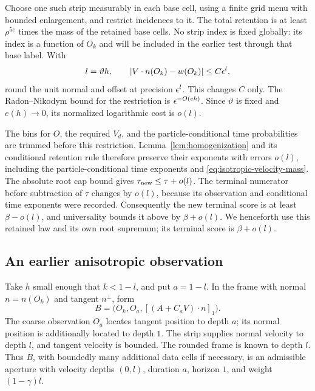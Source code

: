 Choose one such strip measurably in each base cell, using a finite grid menu
with bounded enlargement, and restrict incidences to it. The total retention
is at least $\rho^{5e}$ times the mass of the retained base cells. No strip
index is fixed globally: its index is a function of $O_k$ and will be included
in the earlier test through that base label. With
\begin{equation}
 l=\vartheta h,
 \qquad \lvert V\cdot n(O_k)-w(O_k)\rvert\leq C\epsilon^l,
 \label{eq:isotropic-strip}
\end{equation}
round the unit normal and offset at precision $\epsilon^l$. This changes $C$ only.
The Radon--Nikodym bound for the restriction is $\epsilon^{-O(eh)}$.
Since $\vartheta$ is fixed and $e(h)\to0$, its normalized logarithmic cost is
$o(l)$.

The bins for $O$, the required $V_d$, and the particle-conditional time
probabilities are trimmed before this restriction. Lemma~\ref{lem:homogenization}
and its conditional retention rule
therefore preserve their exponents with errors $o(l)$, including the
particle-conditional time exponents and \eqref{eq:isotropic-velocity-mass}.
The absolute root cap bound gives $\tau_{\rm new}\leq\tau+o(l)$.
The terminal numerator before subtraction of $\tau$ changes by $o(l)$, because
its observation and conditional time exponents were recorded. Consequently
the new terminal score is at least $\beta-o(l)$, and universality bounds it
above by $\beta+o(l)$. We henceforth use this retained law and its own root
supremum; its terminal score is $\beta+o(l)$.

\subsection{An earlier anisotropic observation}

Take $h$ small enough that $k<1-l$, and put $a=1-l$. In the frame with normal
$n=n(O_k)$ and tangent $n^\perp$, form
\begin{equation}
 B=\bigl(O_k,O_a,[(A+C_aV)\cdot n]_1\bigr).
 \label{eq:isotropic-earlier-test}
\end{equation}
The coarse observation $O_a$ locates tangent position to depth $a$; its
normal position is additionally located to depth $1$. The strip supplies
normal velocity to depth $l$, and tangent velocity is bounded. The rounded
frame is known to depth $l$. Thus $B$, with boundedly many additional data
cells if necessary, is an admissible aperture with velocity depths $(0,l)$,
duration $a$, horizon $1$, and weight $(1-\gamma)l$.


